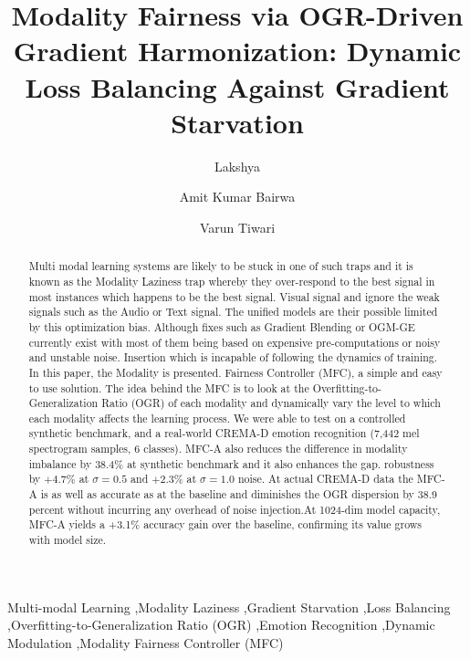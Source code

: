 \documentclass[preprint,a4paper, 10pt, 5p]{elsarticle}
\begin{document}
\begin{frontmatter}

\title{Modality Fairness via OGR-Driven Gradient Harmonization: Dynamic Loss Balancing Against Gradient Starvation}

\author[1]{Lakshya}

\author[1]{Amit Kumar Bairwa}

\author[1]{Varun Tiwari}

\address[1]{Department of Artificial Intelligence and Machine Learning, School of Computer Science and Engineering, Manipal University Jaipur, Jaipur--Ajmer Express Highway, Jaipur, India}

\begin{abstract}
Multi modal learning systems are likely to be stuck in one of such traps and it is known as the Modality Laziness trap whereby they over-respond to the best signal in most instances which happens to be the best signal. Visual signal and ignore the weak signals such as the Audio or Text signal. The unified models are their possible limited by this optimization bias. Although fixes such as Gradient Blending or OGM-GE currently exist with most of them being based on expensive pre-computations or noisy and unstable noise. Insertion which is incapable of following the dynamics of training. In this paper, the Modality is presented. Fairness Controller (MFC), a simple and easy to use solution. The idea behind the MFC is to look at the Overfitting-to-Generalization Ratio (OGR) of each modality and dynamically vary the level to which each modality affects the learning process. We were able to test on a controlled synthetic benchmark, and a real-world CREMA-D emotion recognition (7,442 mel spectrogram samples, 6 classes). MFC-A also reduces the difference in modality imbalance by 38.4\% at synthetic benchmark and it also enhances the gap. robustness by $+4.7\%$ at $\sigma{=}0.5$ and $+2.3\%$ at $\sigma{=}1.0$ noise. At actual CREMA-D data the MFC-A is as well as accurate as at the baseline and diminishes the OGR dispersion by 38.9 percent without incurring any overhead of noise injection.At 1024-dim model capacity, MFC-A yields a +3.1\% accuracy gain over the baseline, confirming its value grows with model size.
\end{abstract}

\begin{keyword}
Multi-modal Learning \sep Modality Laziness \sep Gradient Starvation \sep Loss Balancing \sep Overfitting-to-Generalization Ratio (OGR) \sep Emotion Recognition \sep Dynamic Modulation \sep Modality Fairness Controller (MFC)
\end{keyword}

\end{frontmatter}
\end{document}
